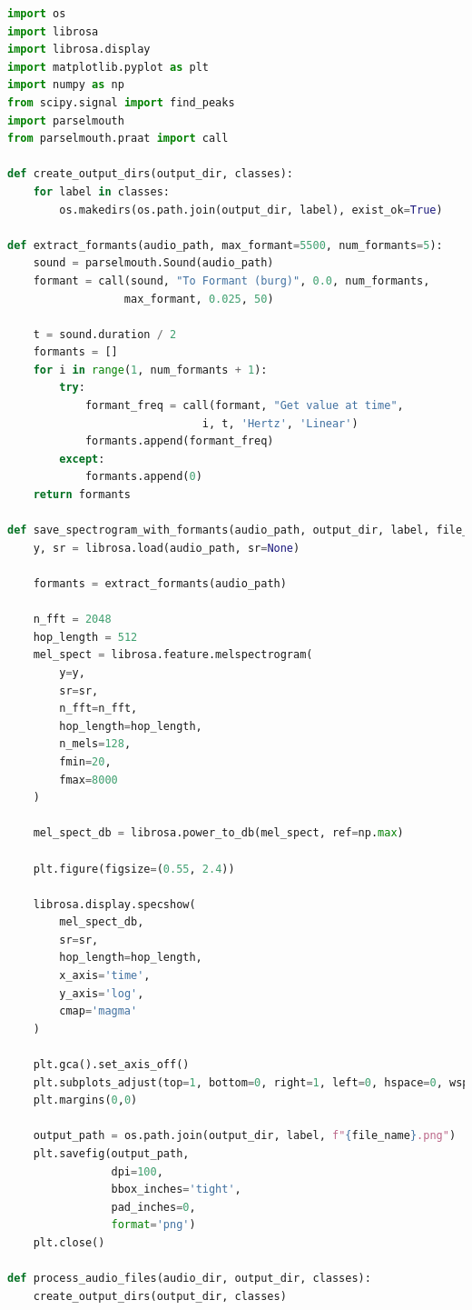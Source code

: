 \begin{lstlisting}[language=Python, caption={Spectrogram Generation with Formant Analysis}]
import os
import librosa
import librosa.display
import matplotlib.pyplot as plt
import numpy as np
from scipy.signal import find_peaks
import parselmouth
from parselmouth.praat import call

def create_output_dirs(output_dir, classes):
    for label in classes:
        os.makedirs(os.path.join(output_dir, label), exist_ok=True)

def extract_formants(audio_path, max_formant=5500, num_formants=5):
    sound = parselmouth.Sound(audio_path)
    formant = call(sound, "To Formant (burg)", 0.0, num_formants, 
                  max_formant, 0.025, 50)
    
    t = sound.duration / 2
    formants = []
    for i in range(1, num_formants + 1):
        try:
            formant_freq = call(formant, "Get value at time", 
                              i, t, 'Hertz', 'Linear')
            formants.append(formant_freq)
        except:
            formants.append(0)
    return formants

def save_spectrogram_with_formants(audio_path, output_dir, label, file_name):
    y, sr = librosa.load(audio_path, sr=None)
    
    formants = extract_formants(audio_path)
    
    n_fft = 2048
    hop_length = 512
    mel_spect = librosa.feature.melspectrogram(
        y=y,
        sr=sr,
        n_fft=n_fft,
        hop_length=hop_length,
        n_mels=128,
        fmin=20,
        fmax=8000
    )
    
    mel_spect_db = librosa.power_to_db(mel_spect, ref=np.max)
    
    plt.figure(figsize=(0.55, 2.4))  

    librosa.display.specshow(
        mel_spect_db,
        sr=sr,
        hop_length=hop_length,
        x_axis='time',
        y_axis='log',  
        cmap='magma'
    )
    
    plt.gca().set_axis_off()
    plt.subplots_adjust(top=1, bottom=0, right=1, left=0, hspace=0, wspace=0)
    plt.margins(0,0)
    
    output_path = os.path.join(output_dir, label, f"{file_name}.png")
    plt.savefig(output_path,
                dpi=100,
                bbox_inches='tight',
                pad_inches=0,
                format='png')
    plt.close()

def process_audio_files(audio_dir, output_dir, classes):
    create_output_dirs(output_dir, classes)
    

\end{lstlisting}
